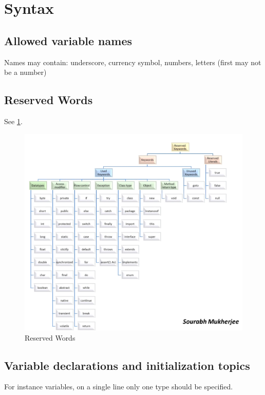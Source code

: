 \documentclass{scrartcl}
\begin{document}
\section{Syntax}
\subsection{Allowed variable names}

    Names may contain: underscore, currency symbol, numbers, letters (first may not be a number)

\subsection{Reserved Words}

    See \ref{fig:reserved-words}.

    \begin{figure}
        \centering
        \includegraphics[width=1\linewidth]{reserved-words}
        \caption{Reserved Words}
        \label{fig:reserved-words}
    \end{figure}

\subsection{Variable declarations and initialization topics}

    For instance variables, on a single line only one type should be specified.
\end{document}
